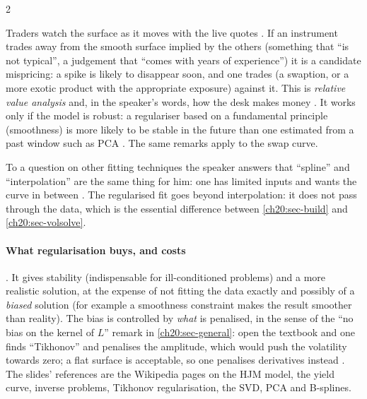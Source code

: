 \begin{paracol}{2}
\begin{finance}
Traders watch the surface as it moves with the live quotes . If an instrument trades away from the smooth surface implied by the others (something that ``is not typical'', a judgement that ``comes with years of experience'') it is a candidate mispricing: a spike is likely
to disappear soon, and one trades (a swaption, or a more exotic product with the appropriate exposure) against it. This is \emph{relative value analysis} and, in the speaker's words, how the desk makes money . It works only if the model is robust: a regulariser based on a fundamental
principle (smoothness) is more likely to be stable in the future than one estimated from a past window such as PCA . The same remarks apply to the swap curve.
\end{finance}

\begin{finance}
To a question on other fitting techniques the speaker answers that ``spline'' and ``interpolation'' are the same thing for him: one has limited inputs and wants the curve in between . The regularised fit goes beyond interpolation: it
does not pass through the data, which is the essential difference between \cref{ch20:sec-build} and \cref{ch20:sec-volsolve}.
\end{finance}

\paragraph{What regularisation buys, and costs} . It gives stability (indispensable for ill-conditioned problems) and a more realistic solution, at the expense of not fitting the data exactly and possibly of a \emph{biased} solution (for example a smoothness constraint makes the result smoother than reality). The bias
is controlled by \emph{what} is penalised, in the sense of the ``no bias on the kernel of $L$'' remark in \cref{ch20:sec-general}: open the textbook and one finds ``Tikhonov'' and penalises the amplitude, which would push the volatility towards zero; a flat surface is acceptable, so one penalises derivatives instead . The
slides' references are the Wikipedia pages on the HJM model, the yield curve, inverse problems, Tikhonov regularisation, the SVD, PCA and B-splines.


\end{paracol}
